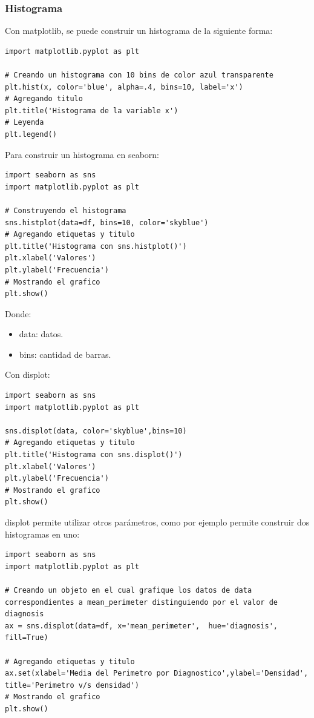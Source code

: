 \documentclass[a4paper, 12pt]{book}
\begin{document}
\subsubsection{Histograma}
Con matplotlib, se puede construir un histograma de la siguiente forma:
\begin{verbatim}
import matplotlib.pyplot as plt
	
# Creando un histograma con 10 bins de color azul transparente
plt.hist(x, color='blue', alpha=.4, bins=10, label='x')
# Agregando titulo
plt.title('Histograma de la variable x')
# Leyenda
plt.legend()
\end{verbatim}

Para construir un histograma en seaborn:
\begin{verbatim}
import seaborn as sns
import matplotlib.pyplot as plt	
	
# Construyendo el histograma
sns.histplot(data=df, bins=10, color='skyblue')
# Agregando etiquetas y titulo
plt.title('Histograma con sns.histplot()')
plt.xlabel('Valores')
plt.ylabel('Frecuencia')
# Mostrando el grafico
plt.show()
\end{verbatim}
Donde:
\begin{itemize}
	\item data: datos.
	\item bins: cantidad de barras.
\end{itemize}

Con displot:
\begin{verbatim}
import seaborn as sns
import matplotlib.pyplot as plt
	
sns.displot(data, color='skyblue',bins=10)
# Agregando etiquetas y titulo
plt.title('Histograma con sns.displot()')
plt.xlabel('Valores')
plt.ylabel('Frecuencia')
# Mostrando el grafico
plt.show()
\end{verbatim}
displot permite utilizar otros parámetros, como por ejemplo permite construir dos histogramas en uno:
\begin{verbatim}
import seaborn as sns
import matplotlib.pyplot as plt
	
# Creando un objeto en el cual grafique los datos de data correspondientes a mean_perimeter distinguiendo por el valor de diagnosis
ax = sns.displot(data=df, x='mean_perimeter',  hue='diagnosis', fill=True)
	
# Agregando etiquetas y titulo
ax.set(xlabel='Media del Perimetro por Diagnostico',ylabel='Densidad', title='Perimetro v/s densidad')
# Mostrando el grafico
plt.show()
\end{verbatim}
\end{document}
